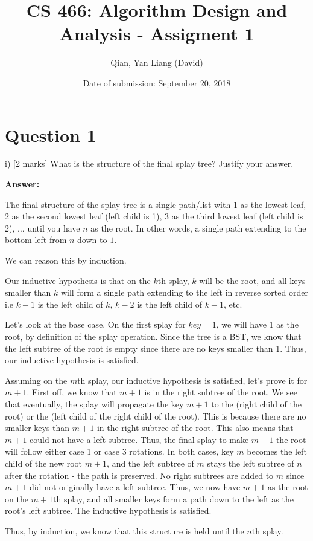 \documentclass{article}
\title{CS 466: Algorithm Design and Analysis - Assigment 1}
\author{Qian, Yan Liang (David)}
\date{Date of submission: September 20, 2018}
\begin{document}
\newpage

\section{Question 1}


i) [2 marks] What is the structure of the final splay tree? Justify your answer.

\textbf{Answer:}

The final structure of the splay tree is a single path/list with 1 as the lowest leaf, 2 as the second lowest
leaf (left child is 1), 3 as the third lowest leaf (left child is 2), $\ldots$  until you have $n$ as the root. In other
words, a single path extending to the bottom left from $n$ down to $1$.

We can reason this by induction.

Our inductive hypothesis is that on the $k$th splay, $k$ will be the root, and all keys smaller than $k$ will form
a single path extending to the left in reverse sorted order i.e $k-1$ is the left child of $k$, $k-2$ is the left child
of $k-1$, etc.

Let's look at the base case. On the first splay for $key = 1$, we will have 1 as the root, by definition of the splay
operation. Since the tree is a BST, we know that the left subtree of the root is empty since there are no keys smaller
than 1. Thus, our inductive hypothesis is satisfied.

Assuming on the $m$th splay, our inductive hypothesis is satisfied, let's prove it for $m + 1$. First off, we know that
$m + 1$ is in the right subtree of the root. We see that eventually, the splay will propagate the key $m +
1$ to the (right child of the root) or the (left child of the right child of the root). This is because there are no smaller
keys than $m + 1$ in the right subtree of the root. This also means that $m + 1$ could not have a left subtree.
Thus, the final splay to make $m + 1$ the root will follow either case 1
or case 3 rotations. In both cases, key $m$ becomes the left child of the new root $m + 1$, and the left subtree of $m$
stays the left subtree of $n$ after the rotation - the path is preserved. No right subtrees are added to $m$ since $m +
1$ did not originally have a left subtree. Thus, we now have $m + 1$ as the root on the $m + 1$th splay, and all smaller
keys form a path down to the left as the root's left subtree. The inductive hypothesis is satisfied.

Thus, by induction, we know that this structure is held until the $n$th splay.
\end{document}
